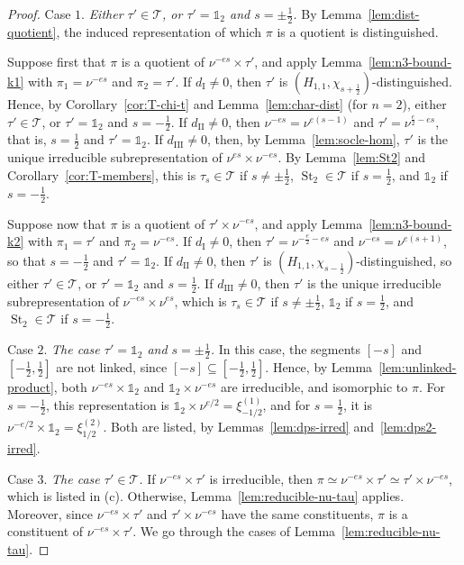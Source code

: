 \documentclass[11pt]{amsart}
\numberwithin{equation}{section}
\theoremstyle{plain}
\theoremstyle{definition}
\theoremstyle{remark}
\newcommand{\one}{\mathds{1}}
\newcommand{\T}{\mathcal{T}}
\DeclareMathOperator{\St}{St}
\newcommand{\xione}{\xi^{(1)}}
\newcommand{\xitwo}{\xi^{(2)}}
\newcommand{\dI}{d_{\mathrm{I}}}
\newcommand{\dII}{d_{\mathrm{II}}}
\newcommand{\dIII}{d_{\mathrm{III}}}
\begin{document}
\begin{proof}
	Case $1$. \emph{Either $\tau'\in\T$, or $\tau'=\one_2$ and $s=\pm\frac12$.} By Lemma~\ref{lem:dist-quotient}, the induced representation of which $\pi$ is a quotient is distinguished.
	
	Suppose first that $\pi$ is a quotient of $\nu^{-es}\times\tau'$, and apply Lemma~\ref{lem:n3-bound-k1} with $\pi_1=\nu^{-es}$ and $\pi_2=\tau'$. If $\dI\ne0$, then $\tau'$ is $(H_{1,1},\chi_{s+\frac12})$-distinguished. Hence, by Corollary~\ref{cor:T-chi-t} and Lemma~\ref{lem:char-dist} (for $n=2$), either $\tau'\in\T$, or $\tau'=\one_2$ and $s=-\frac12$. If $\dII\ne0$, then $\nu^{-es}=\nu^{e(s-1)}$ and $\tau'=\nu^{\frac e2-es}$, that is, $s=\frac12$ and $\tau'=\one_2$. If $\dIII\ne0$, then, by Lemma~\ref{lem:socle-hom}, $\tau'$ is the unique irreducible subrepresentation of $\nu^{es}\times\nu^{-es}$. By Lemma~\ref{lem:St2} and Corollary~\ref{cor:T-members}, this is $\tau_s\in\T$ if $s\ne\pm\frac12$, $\St_2\in\T$ if $s=\frac12$, and $\one_2$ if $s=-\frac12$.
	
	Suppose now that $\pi$ is a quotient of $\tau'\times\nu^{-es}$, and apply Lemma~\ref{lem:n3-bound-k2} with $\pi_1=\tau'$ and $\pi_2=\nu^{-es}$. If $\dI\ne0$, then $\tau'=\nu^{-\frac e2-es}$ and $\nu^{-es}=\nu^{e(s+1)}$, so that $s=-\frac12$ and $\tau'=\one_2$. If $\dII\ne0$, then $\tau'$ is $(H_{1,1},\chi_{s-\frac12})$-distinguished, so either $\tau'\in\T$, or $\tau'=\one_2$ and $s=\frac12$. If $\dIII\ne0$, then $\tau'$ is the unique irreducible subrepresentation of $\nu^{-es}\times\nu^{es}$, which is $\tau_s\in\T$ if $s\ne\pm\frac12$, $\one_2$ if $s=\frac12$, and $\St_2\in\T$ if $s=-\frac12$.
	
	Case $2$. \emph{The case $\tau'=\one_2$ and $s=\pm\frac12$.} In this case, the segments $[-s]$ and $[-\frac12,\frac12]$ are not linked, since $[-s]\subseteq[-\frac12,\frac12]$. Hence, by Lemma~\ref{lem:unlinked-product}, both $\nu^{-es}\times\one_2$ and $\one_2\times\nu^{-es}$ are irreducible, and isomorphic to $\pi$. For $s=-\frac12$, this representation is $\one_2\times\nu^{e/2}=\xione_{-1/2}$, and for $s=\frac12$, it is $\nu^{-e/2}\times\one_2=\xitwo_{1/2}$. Both are listed, by Lemmas~\ref{lem:dps-irred} and~\ref{lem:dps2-irred}.
	
	Case $3$.  \emph{The case $\tau'\in\T$.} If $\nu^{-es}\times\tau'$ is irreducible, then $\pi\simeq\nu^{-es}\times\tau'\simeq\tau'\times\nu^{-es}$, which is listed in (c). Otherwise, Lemma~\ref{lem:reducible-nu-tau} applies. Moreover, since $\nu^{-es}\times\tau'$ and $\tau'\times\nu^{-es}$ have the same constituents, $\pi$ is a constituent of $\nu^{-es}\times\tau'$. We go through the cases of Lemma~\ref{lem:reducible-nu-tau}.
	

\end{proof}
\end{document}
